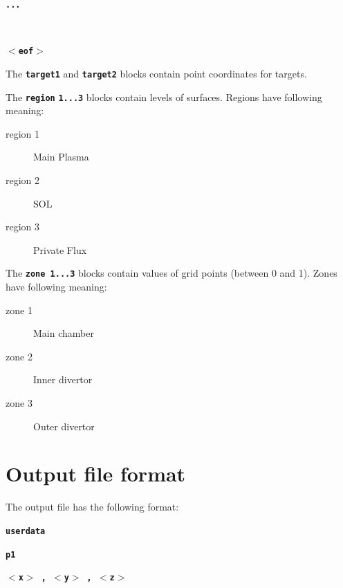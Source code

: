 \documentclass[12pt]{report}
\begin{document}
\textbf{\texttt{...}}

\textbf{\texttt{~}}

\textbf{\texttt{\begin{math}<\end{math}eof\begin{math}>\end{math}}}

The \textbf{\texttt{target1}} and \textbf{\texttt{target2}} blocks
contain point coordinates for targets.

The \textbf{\texttt{region}} \textbf{\texttt{1...3}} blocks contain
levels of surfaces. Regions have following meaning:
\begin{description}
  \item[region 1] Main Plasma
  \item[region 2] SOL
  \item[region 3] Private Flux
\end{description}

The \textbf{\texttt{zone 1...3}} blocks contain values of grid points
(between 0 and 1). Zones have following meaning:
\begin{description}
  \item[zone 1] Main chamber
  \item[zone 2] Inner divertor
  \item[zone 3] Outer divertor
\end{description}

\section{Output file format}

The output file has the following format:

\textbf{\texttt{userdata}}


\textbf{\texttt{p1}}


\textbf{\texttt{\begin{math}<\end{math}x\begin{math}>\end{math} ,
\begin{math}<\end{math}y\begin{math}>\end{math} ,
\begin{math}<\end{math}z\begin{math}>\end{math}}}
\end{document}
